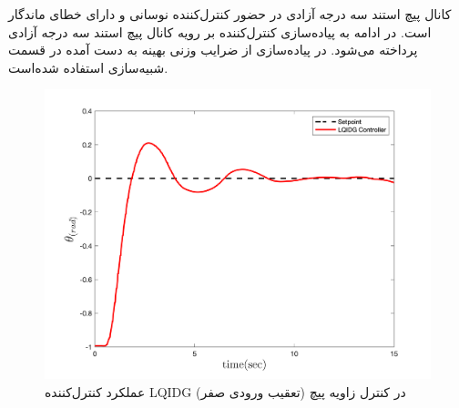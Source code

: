 کانال پیچ استند سه درجه آزادی در حضور کنترل‌کننده  نوسانی و دارای خطای ماندگار است.
در ادامه به پیاده‌سازی کنترل‌کننده  بر رویه کانال پیچ استند سه درجه آزادی پرداخته می‌شود.
در پیاده‌سازی از ضرایب وزنی بهینه به دست آمده در قسمت شبیه‌سازی استفاده شده‌است.
\begin{figure}[H]
	\includegraphics[width=.48\linewidth]{../Figures/Calibration/LQIDG/Pitch/lqidg_pitch.png}
	\centering
	\caption{عملكرد کنترل‌کننده  LQIDG در کنترل زاويه پیچ (تعقیب ورودی صفر)}
\end{figure}


